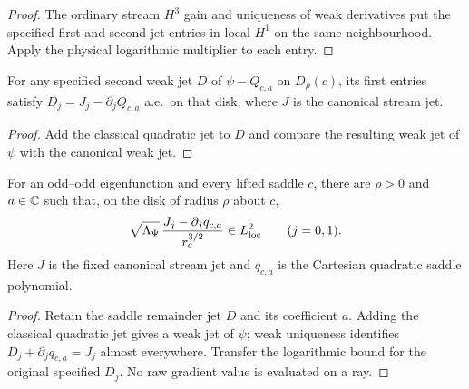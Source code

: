 \begin{proof}
\leanok
The ordinary stream $H^3$ gain and uniqueness of weak derivatives put
the specified first and second jet entries in local $H^1$ on the same
neighbourhood. Apply the physical logarithmic multiplier to each entry.
\end{proof}

\begin{lemma}
\label{lem:canonical-saddle-first-jet}
\leanok
For any specified second weak jet $D$ of $\psi-Q_{c,a}$ on $D_\rho(c)$,
its first entries satisfy $D_j=J_j-\partial_jQ_{c,a}$ a.e.\ on that disk,
where $J$ is the canonical stream jet.
\end{lemma}

\begin{proof}
\leanok
Add the classical quadratic jet to $D$ and compare the resulting weak jet
of $\psi$ with the canonical weak jet.
\end{proof}

\begin{lemma}
\label{lem:dd-log-saddle-remainder}
\leanok
For an odd--odd eigenfunction and every lifted saddle $c$, there are
$\rho>0$ and $a\in\mathbb{C}$ such that, on the disk of radius $\rho$ about $c$,
\[
 \sqrt{\Lambda_\Psi}\,
   \frac{J_j-\partial_jq_{c,a}}{r_c^{3/2}}\in L^2_{\rm loc}
 \qquad(j=0,1).
\]
Here $J$ is the fixed canonical stream jet and $q_{c,a}$ is the
Cartesian quadratic saddle polynomial.
\end{lemma}

\begin{proof}
\leanok
Retain the saddle remainder jet $D$ and its coefficient $a$.
Adding the classical quadratic jet gives a weak jet of $\psi$;
weak uniqueness identifies $D_j+\partial_jq_{c,a}=J_j$ almost everywhere.
Transfer the logarithmic bound for the original specified $D_j$.
No raw gradient value is evaluated on a ray.
\end{proof}

